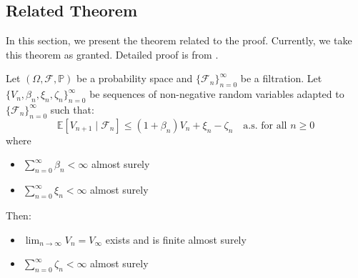\subsection{Related Theorem}
In this section, we present the theorem related to the proof. Currently, we take this theorem as granted. Detailed proof is from \cite{robbins1971convergence}.
\begin{theorem}\label{thm:robbins siegmund}
Let $(\Omega, \mathcal{F}, \mathbb{P})$ be a probability space and $\{\mathcal{F}_n\}_{n=0}^{\infty}$ be a filtration. Let $\{V_n,\beta_n, \xi_n, \zeta_n\}_{n=0}^\infty$ be sequences of non-negative random variables adapted to $\{\mathcal{F}_n\}_{n=0}^{\infty}$ such that:
$$
\mathbb{E}[V_{n+1} \mid \mathcal{F}_n] \leq (1+\beta_n)V_n+\xi_n-\zeta_n\quad \text{a.s. for all } n \geq 0
$$
where
\begin{itemize}
    \item $\sum_{n=0}^\infty \beta_n<\infty$ almost surely
    \item $\sum_{n=0}^\infty \xi_n<\infty$ almost surely
\end{itemize}
Then:
\begin{itemize}
    \item $\lim_{n\to\infty}V_n = V_\infty$ exists and is finite almost surely
    \item $\sum_{n=0}^\infty \zeta_n<\infty$ almost surely
\end{itemize}
\end{theorem}

